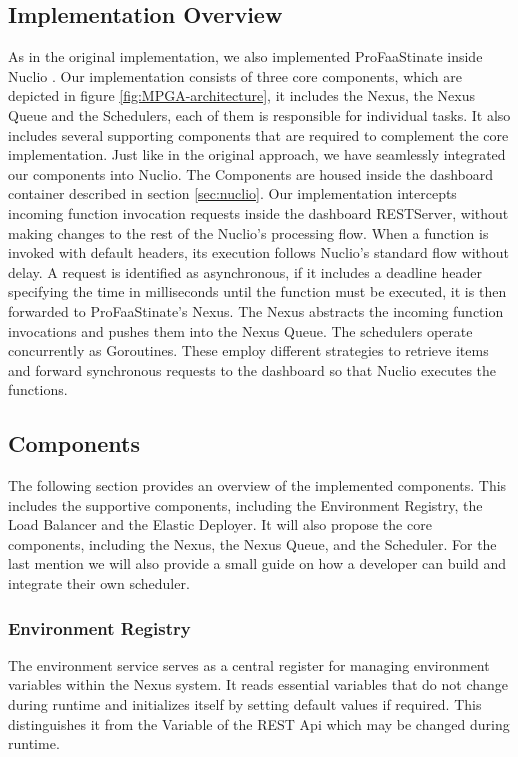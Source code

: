 \subsection{Implementation Overview}
As in the original implementation, we also implemented ProFaaStinate inside Nuclio \cite{schirmer2023profaastinate}. Our implementation consists of three core components, which are depicted in figure \ref{fig:MPGA-architecture}, it includes the Nexus, the Nexus Queue and the Schedulers, each of them is responsible for individual tasks. It also includes several supporting components that are required to complement the core implementation. Just like in the original approach, we have seamlessly integrated our components into Nuclio. The Components are housed inside the dashboard container described in section \ref{sec:nuclio}. Our implementation intercepts incoming function invocation requests inside the dashboard RESTServer, without making changes to the rest of the Nuclio's processing flow. When a function is invoked with default headers, its execution follows Nuclio's standard flow without delay. A request is identified as asynchronous, if it includes a deadline header specifying the time in milliseconds until the function must be executed, it is then forwarded to ProFaaStinate's Nexus. The Nexus abstracts the incoming function invocations and pushes them into the Nexus Queue. The schedulers operate concurrently as Goroutines. These employ different strategies to retrieve items and forward synchronous requests to the dashboard so that Nuclio executes the functions.

\subsection{Components}

The following section provides an overview of the implemented components. This includes the supportive components, including the Environment Registry, the Load Balancer and the Elastic Deployer. It will also propose the core components, including the Nexus, the Nexus Queue, and the Scheduler. For the last mention we will also provide a small guide on how a developer can build and integrate their own scheduler. 

\subsubsection{Environment Registry}
\label{sec:env-registry}
The environment service serves as a central register for managing environment variables within the Nexus system. It reads essential variables that do not change during runtime and initializes itself by setting default values if required. This distinguishes it from the Variable of the REST Api which may be changed during runtime. 


